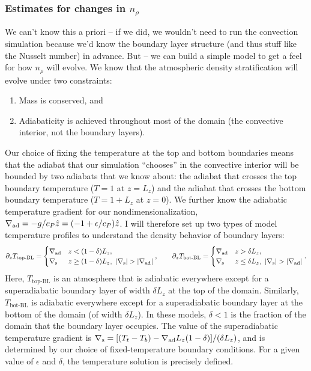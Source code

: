 \subsubsection{Estimates for changes in $n_\rho$}
We can't know this a priori -- if we did, we wouldn't need to run the convection simulation because we'd know the boundary layer structure (and thus stuff like the Nusselt number) in advance.
But -- we can build a simple model to get a feel for how $n_\rho$ will evolve.
We know that the atmospheric density stratification will evolve under two constraints:
\begin{enumerate}
\item Mass is conserved, and
\item Adiabaticity is achieved throughout most of the domain (the convective interior, not the boundary layers).
\end{enumerate}
Our choice of fixing the temperature at the top and bottom boundaries means that the adiabat that our simulation ``chooses'' in the convective interior will be bounded by two adiabats that we know about: the adiabat that crosses the top boundary temperature ($T = 1$ at $z = L_z$) and the adiabat that crosses the bottom boundary temperature ($T = 1 + L_z$ at $z = 0$).
We further know the adiabatic temperature gradient for our nondimensionalization, $\nabla_{\text{ad}} = -g / c_P \hat{z} = (-1 + \epsilon/c_P)\hat{z}$.
I will therefore set up two types of model temperature profiles to understand the density behavior of boundary layers:
\begin{equation}
\partial_z T_{\text{top-BL}} = \begin{cases}
\nabla_{\text{ad}} & z < (1-\delta) L_z, \\
\nabla_{\text{s}}  & z \geq (1-\delta) L_z, \,\, |\nabla_{\text{s}}| > |\nabla_{\text{ad}}|
\end{cases},\qquad
\partial_z T_{\text{bot-BL}} = \begin{cases}
\nabla_{\text{ad}} & z > \delta L_z, \\
\nabla_{\text{s}}  & z \leq \delta L_z, \,\, |\nabla_{\text{s}}| > |\nabla_{\text{ad}}|
\end{cases}.
\end{equation}
Here, $T_{\text{top-BL}}$ is an atmosphere that is adiabatic everywhere except for a superadiabatic boundary layer of width $\delta L_z$ at the top of the domain.
Similarly, $T_{\text{bot-BL}}$ is adiabatic everywhere except for a superadiabatic boundary layer at the bottom of the domain (of width $\delta L_z$).
In these models, $\delta < 1$ is the fraction of the domain that the boundary layer occupies.
The value of the superadiabatic temperature gradient is $\nabla_{\text{s}} = [(T_t - T_b) - \nabla_{\text{ad}} L_z (1 - \delta)] / (\delta L_z)$, and is determined by our choice of fixed-temperature boundary conditions.
For a given value of $\epsilon$ and $\delta$, the temperature solution is precisely defined.

